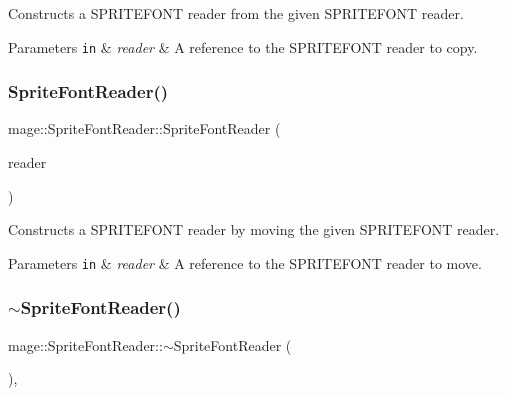 Constructs a S\+P\+R\+I\+T\+E\+F\+O\+NT reader from the given S\+P\+R\+I\+T\+E\+F\+O\+NT reader.


\begin{DoxyParams}[1]{Parameters}
\mbox{\tt in}  & {\em reader} & A reference to the S\+P\+R\+I\+T\+E\+F\+O\+NT reader to copy. \\
\hline
\end{DoxyParams}
\hypertarget{classmage_1_1_sprite_font_reader_aa75a98a2573636fa9e1cde4fbe9c1b93}{}\label{classmage_1_1_sprite_font_reader_aa75a98a2573636fa9e1cde4fbe9c1b93} 
\subsubsection{\texorpdfstring{Sprite\+Font\+Reader()}{SpriteFontReader()}\hspace{0.1cm}{\footnotesize\ttfamily [3/3]}}
{\footnotesize\ttfamily mage\+::\+Sprite\+Font\+Reader\+::\+Sprite\+Font\+Reader (\begin{DoxyParamCaption}\item[{\hyperlink{classmage_1_1_sprite_font_reader}{Sprite\+Font\+Reader} \&\&}]{reader }\end{DoxyParamCaption})\hspace{0.3cm}{\ttfamily [default]}}

Constructs a S\+P\+R\+I\+T\+E\+F\+O\+NT reader by moving the given S\+P\+R\+I\+T\+E\+F\+O\+NT reader.


\begin{DoxyParams}[1]{Parameters}
\mbox{\tt in}  & {\em reader} & A reference to the S\+P\+R\+I\+T\+E\+F\+O\+NT reader to move. \\
\hline
\end{DoxyParams}
\hypertarget{classmage_1_1_sprite_font_reader_ac2c18498abf115d296c0314845562481}{}\label{classmage_1_1_sprite_font_reader_ac2c18498abf115d296c0314845562481} 
\subsubsection{\texorpdfstring{$\sim$\+Sprite\+Font\+Reader()}{~SpriteFontReader()}}
{\footnotesize\ttfamily mage\+::\+Sprite\+Font\+Reader\+::$\sim$\+Sprite\+Font\+Reader (\begin{DoxyParamCaption}{ }\end{DoxyParamCaption})\hspace{0.3cm}{\ttfamily [virtual]}, {\ttfamily [default]}}

